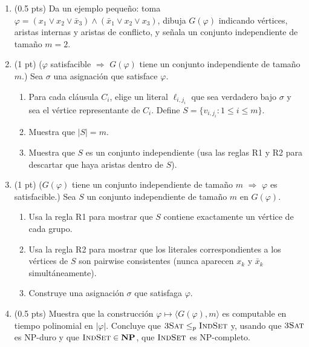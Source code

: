 \documentclass[12pt, letterpaper]{article}
\newcommand{\tSAT}{\textsc{3Sat}}
\newcommand{\NP}{\mathbf{NP}}
\begin{document}
\begin{enumerate}[label=\alph*)]

\item (0.5 pts) Da un ejemplo pequeño: toma $\varphi = (x_1 \vee x_2 \vee
  \bar{x}_3) \wedge (\bar{x}_1 \vee x_2 \vee x_3)$, dibuja $G(\varphi)$
  indicando vértices, aristas internas y aristas de conflicto, y señala un
  conjunto independiente de tamaño $m = 2$.

\item (1 pt) ($\varphi$ satisfacible $\Rightarrow$ $G(\varphi)$ tiene
  un conjunto independiente de tamaño $m$.)  Sea $\sigma$ una asignación
  que satisface $\varphi$.
  \begin{enumerate}[label=\roman*.]
    \item Para cada cláusula $C_i$, elige un literal $\ell_{i,j_i}$ que
      sea verdadero bajo $\sigma$ y sea el vértice representante de $C_i$.
      Define $S = \{v_{i,j_i} : 1 \leq i \leq m\}$.
    \item Muestra que $|S| = m$.
    \item Muestra que $S$ es un conjunto independiente (usa las reglas R1
      y R2 para descartar que haya aristas dentro de $S$).
  \end{enumerate}

\item (1 pt) ($G(\varphi)$ tiene un conjunto independiente de tamaño $m$
  $\Rightarrow$ $\varphi$ es satisfacible.)  Sea $S$ un conjunto independiente
  de tamaño $m$ en $G(\varphi)$.
  \begin{enumerate}[label=\roman*.]
    \item Usa la regla R1 para mostrar que $S$ contiene exactamente un
      vértice de cada grupo.
    \item Usa la regla R2 para mostrar que los literales correspondientes
      a los vértices de $S$ son pairwise consistentes (nunca aparecen $x_k$
      y $\bar{x}_k$ simultáneamente).
    \item Construye una asignación $\sigma$ que satisfaga $\varphi$.
  \end{enumerate}

\item (0.5 pts) Muestra que la construcción $\varphi \mapsto
  \langle G(\varphi), m \rangle$ es computable en tiempo polinomial en
  $|\varphi|$.  Concluye que $\tSAT \leq_p \textsc{IndSet}$ y, usando que
  $\tSAT$ es NP-duro y que $\textsc{IndSet} \in \NP$, que
  $\textsc{IndSet}$ es NP-completo.

\end{enumerate}
\end{document}
